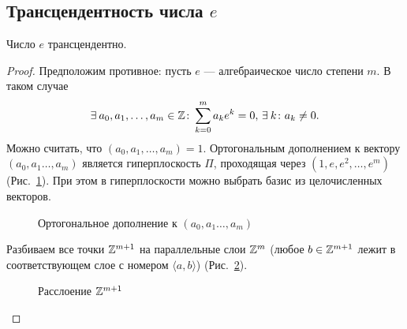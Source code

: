 \subsection{\texorpdfstring{Трансцендентность числа $e$}{Трансцендентность числа e}}
\label{III_E-transcendental}

\begin{ntheorem}
    Число $e$ трансцендентно.
\end{ntheorem}
\begin{proof}
    Предположим противное: пусть $e$ --- алгебраическое число степени $m$. В таком случае
    \[
        \exists a_0, a_1, \dots, a_m \in \ZZ\colon \sum_{k=0}^m a_ke^k = 0,\, \exists k\colon a_k \ne 0.
    \]
    Можно считать, что $\left( a_0, a_1, \dots, a_m \right) = 1$. Ортогональным дополнением к вектору ${\left( a_0, a_1 \dots, a_m \right)}$ является гиперплоскость $\Pi$, проходящая через $\left( 1, e, e^2, \dots, e^m \right)$ (Рис.~\ref{fg:IV-1}). При этом в гиперплоскости можно выбрать базис из целочисленных векторов.
    \begin{figure}[h]
        \centering
        
        \caption{Ортогональное дополнение к $\left( a_0, a_1 \dots, a_m \right)$}
        \label{fg:IV-1}
    \end{figure}

    Разбиваем все точки $\mathbb{Z}^{m+1}$ на параллельные слои $\mathbb{Z}^m$ (любое $b \in \mathbb{Z}^{m+1}$ лежит в соответствующем слое с номером $\langle a, b \rangle$) (Рис.~\ref{fg:IV-2}).
    
    \begin{figure}[!ht]
        \centering
        
        \caption{Расслоение $\mathbb{Z}^{m+1}$}
        \label{fg:IV-2}
    \end{figure}
    

\end{proof}
